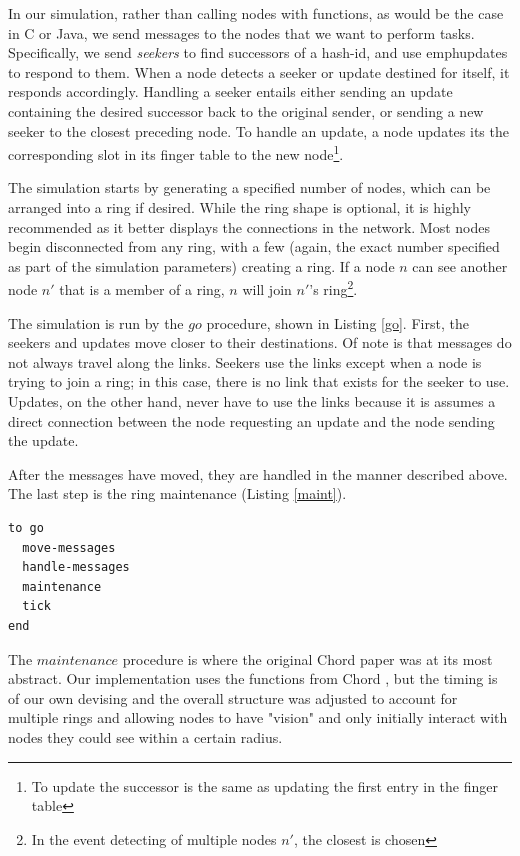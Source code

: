 \documentclass[12pt]{ieeetran} %
\begin{document}
In our simulation, rather than calling nodes with functions, as would be the case in C or Java, we send messages to the nodes that we want to perform tasks. Specifically, we send \emph{seekers} to find successors of a hash-id, and use emph{updates} to respond to them.  When a node detects a seeker or update destined for itself, it responds accordingly.  Handling a seeker entails either sending an update containing the desired successor back to the original sender, or sending a new seeker to the closest preceding node.  To handle an update, a node updates its the corresponding slot in its finger table to the new node\footnote{To update the successor is the same as updating the first entry in the finger table}.


The simulation starts by generating a specified number of nodes, which can be arranged into a ring if desired.  While the ring shape is optional, it is highly recommended as it better displays the connections in the network.  Most nodes begin disconnected from any ring, with a few (again, the exact number specified as part of the simulation parameters) creating a ring.  If a node $n$ can see another node $n'$ that is a member of a ring, $n$ will join  $n'$'s ring\footnote{In the event detecting of multiple nodes $n'$, the closest is chosen}. 

The simulation is run by the $go$ procedure, shown in Listing \ref{go}.  First, the seekers and updates move closer to their destinations.
 Of note is that messages do not always travel along the links.  Seekers use the links except when a node is trying to join a ring;  in this case, there is no link that exists for the seeker to use. Updates, on the other hand, never have to use the links because it is assumes a direct connection between the node requesting an update and the node sending the update.

After the messages have moved, they are handled in the manner described above. The last step is the ring maintenance (Listing \ref{maint}).

\begin{lstlisting}[caption={The topmost procedure of the simulation.},label=go]
to go
  move-messages
  handle-messages
  maintenance
  tick
end
\end{lstlisting}


The $maintenance$ procedure is where the original Chord paper was at its most abstract.  Our implementation uses the functions from Chord \cite{Chord}, but the timing is of our own devising and the overall structure was adjusted to account for multiple rings and allowing nodes to have "vision"  and only initially interact with nodes they could see within a certain radius.
\end{document}
